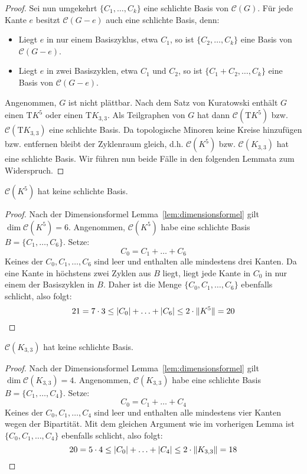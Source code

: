 \documentclass[10pt,b5paper]{article}
\begin{document}
\begin{proof}
Sei nun umgekehrt $\{C_1,\ldots, C_k\}$ eine schlichte Basis von $\mathcal{C}(G)$. Für jede Kante $e$ besitzt $\mathcal{C}(G-e)$ auch eine schlichte Basis, denn:
\begin{itemize}
\item Liegt $e$ in nur einem Basiszyklus, etwa $C_1$, so ist $\{C_2,\ldots, C_k\}$ eine Basis von $\mathcal{C}(G-e)$.
\item Liegt $e$ in zwei Basiszyklen, etwa $C_1$ und $C_2$, so ist $\{C_1+C_2,\ldots, C_k\}$ eine Basis von $\mathcal{C}(G-e)$.
\end{itemize}
Angenommen, $G$ ist nicht plättbar. Nach dem Satz von Kuratowski enthält $G$ einen $\mathrm{T}K^5$ oder einen $\mathrm{T}K_{3,3}$. Als Teilgraphen  von $G$ hat dann $\mathcal{C}(\mathrm{T}K^5)$ bzw. $\mathcal{C}(\mathrm{T}K_{3,3})$ eine schlichte Basis. Da topologische Minoren keine Kreise hinzufügen bzw. entfernen bleibt der Zyklenraum gleich, d.h. $\mathcal{C}(K^5)$ bzw. $\mathcal{C}(K_{3,3})$ hat eine schlichte Basis. Wir führen nun beide Fälle in den folgenden Lemmata zum Widerspruch.
\end{proof}

\begin{lemma}
$\mathcal{C}(K^5)$ hat keine schlichte Basis.
\end{lemma}

\begin{proof}
Nach der Dimensionsformel Lemma~\ref{lem:dimensionsformel} gilt $\dim\mathcal{C}(K^5) = 6$. Angenommen, $\mathcal{C}(K^5)$ habe eine schlichte Basis $B=\{C_1,\ldots,C_6\}$. Setze:
\[ C_0 = C_1+\ldots + C_6 \]
Keines der $C_0, C_1,\ldots, C_6$ sind leer und enthalten alle mindestens drei Kanten. Da eine Kante in höchstens zwei Zyklen aus $B$ liegt, liegt jede Kante in $C_0$ in nur einem der Basiszyklen in $B$. Daher ist die Menge $\{C_0,C_1,\ldots ,C_6\}$ ebenfalls schlicht, also folgt:
\[ 21 = 7\cdot 3 \leq |C_0|+\ldots + |C_6| \leq 2\cdot \|K^5\| = 20 \qedhere \]
\end{proof}

\begin{lemma}
$\mathcal{C}(K_{3,3})$ hat keine schlichte Basis.
\end{lemma}

\begin{proof}
Nach der Dimensionsformel Lemma~\ref{lem:dimensionsformel} gilt $\dim\mathcal{C}(K_{3,3}) = 4$. Angenommen,  $\mathcal{C}(K_{3,3})$ habe eine schlichte Basis $B=\{C_1,\ldots, C_4\}$. Setze:
\[ C_0 = C_1+\ldots + C_4 \]
Keines der $C_0,C_1,\ldots,C_4$ sind leer und enthalten alle mindestens vier Kanten wegen der Bipartität. Mit dem gleichen Argument wie im vorherigen Lemma ist $\{C_0,C_1,\ldots,C_4\}$ ebenfalls schlicht, also folgt:
\[ 20 = 5\cdot 4 \leq |C_0|+\ldots + |C_4|\leq 2\cdot \|K_{3,3}\| = 18\qedhere \]
\end{proof}
\end{document}
